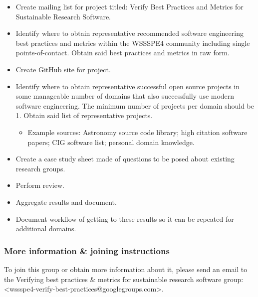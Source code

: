 \begin{itemize}
\item Create mailing list for project titled:  Verify Best Practices and Metrics for Sustainable Research Software.
\item Identify where to obtain representative recommended software engineering best practices and metrics within the WSSSPE4 community including single points-of-contact.  Obtain said best practices and metrics in raw form.
\item Create GitHub site for project.
\item Identify where to obtain representative successful open source projects in some manageable number of domains that also successfully use modern software engineering.  The minimum number of projects per domain should be 1. Obtain said list of representative projects.

\begin{itemize}
\item Example sources: Astronomy source code library; high citation software papers; CIG software list; personal domain knowledge.
\end{itemize}

\item Create a case study sheet made of questions to be posed about existing research groups.
\item Perform review.
\item Aggregate results and document.  
\item Document workflow of getting to these results so it can be repeated for additional domains.
\end{itemize}


\subsubsection{More information \& joining instructions}

To join this group or obtain more information about it, please send an email to the Verifying best practices \& metrics for sustainable research software group: <wssspe4-verify-best-practices@googlegroups.com>.
